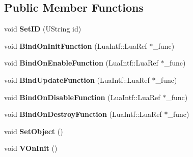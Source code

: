 \subsection*{Public Member Functions}
\begin{DoxyCompactItemize}
\item 
\hypertarget{class_vixen_1_1_lua_script_a872cdc010b981dce1c2c13c8093762a8}{}void {\bfseries Set\+I\+D} (U\+String id)\label{class_vixen_1_1_lua_script_a872cdc010b981dce1c2c13c8093762a8}

\item 
\hypertarget{class_vixen_1_1_lua_script_ac35a5bcbd9ddade188f1c1fa563d0424}{}void {\bfseries Bind\+On\+Init\+Function} (Lua\+Intf\+::\+Lua\+Ref $\ast$\+\_\+func)\label{class_vixen_1_1_lua_script_ac35a5bcbd9ddade188f1c1fa563d0424}

\item 
\hypertarget{class_vixen_1_1_lua_script_a3032edad018ef3afc18792a10bec58ca}{}void {\bfseries Bind\+On\+Enable\+Function} (Lua\+Intf\+::\+Lua\+Ref $\ast$\+\_\+func)\label{class_vixen_1_1_lua_script_a3032edad018ef3afc18792a10bec58ca}

\item 
\hypertarget{class_vixen_1_1_lua_script_a328e0f6d9f6e69ace7026990b9520e53}{}void {\bfseries Bind\+Update\+Function} (Lua\+Intf\+::\+Lua\+Ref $\ast$\+\_\+func)\label{class_vixen_1_1_lua_script_a328e0f6d9f6e69ace7026990b9520e53}

\item 
\hypertarget{class_vixen_1_1_lua_script_a2b6f5b1ba723a3110398b3a26ebf9e8a}{}void {\bfseries Bind\+On\+Disable\+Function} (Lua\+Intf\+::\+Lua\+Ref $\ast$\+\_\+func)\label{class_vixen_1_1_lua_script_a2b6f5b1ba723a3110398b3a26ebf9e8a}

\item 
\hypertarget{class_vixen_1_1_lua_script_af9b4624179f9f67a20369688870d9849}{}void {\bfseries Bind\+On\+Destroy\+Function} (Lua\+Intf\+::\+Lua\+Ref $\ast$\+\_\+func)\label{class_vixen_1_1_lua_script_af9b4624179f9f67a20369688870d9849}

\item 
\hypertarget{class_vixen_1_1_lua_script_a66eb045b0e4f273897573d18a6f0e0ad}{}void {\bfseries Set\+Object} ()\label{class_vixen_1_1_lua_script_a66eb045b0e4f273897573d18a6f0e0ad}

\item 
\hypertarget{class_vixen_1_1_lua_script_aee09df441edb46ebff28be4555e704aa}{}void {\bfseries V\+On\+Init} ()\label{class_vixen_1_1_lua_script_aee09df441edb46ebff28be4555e704aa}


\end{DoxyCompactItemize}
